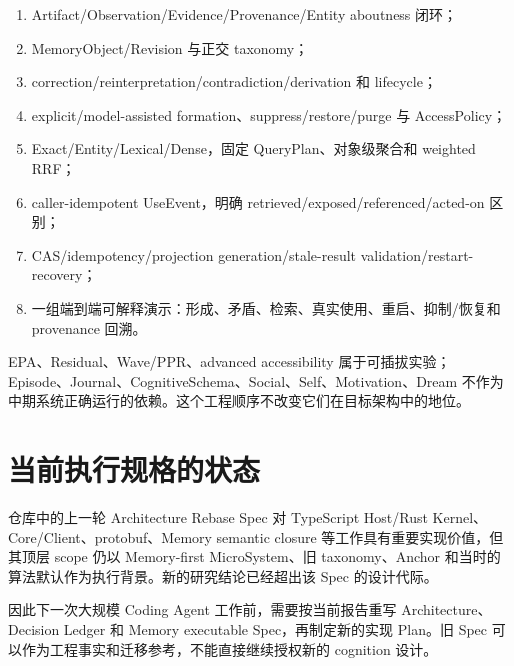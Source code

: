 \begin{enumerate}
\item Artifact/\allowbreak Observation/\allowbreak Evidence/\allowbreak Provenance/\allowbreak Entity aboutness 闭环；
\item MemoryObject/Revision 与正交 taxonomy；
\item correction/\allowbreak reinterpretation/\allowbreak contradiction/\allowbreak derivation 和 lifecycle；
\item explicit/model-assisted formation、suppress/restore/purge 与 AccessPolicy；
\item Exact/Entity/Lexical/Dense，固定 QueryPlan、对象级聚合和 weighted RRF；
\item caller-idempotent UseEvent，明确 retrieved/exposed/referenced/acted-on 区别；
\item CAS/idempotency/projection generation/stale-result validation/restart-recovery；
\item 一组端到端可解释演示：形成、矛盾、检索、真实使用、重启、抑制/恢复和 provenance 回溯。
\end{enumerate}

EPA、Residual、Wave/PPR、advanced accessibility 属于可插拔实验；Episode、Journal、CognitiveSchema、Social、Self、Motivation、Dream 不作为中期系统正确运行的依赖。这个工程顺序不改变它们在目标架构中的地位。

\section{当前执行规格的状态}

仓库中的上一轮 Architecture Rebase Spec 对 TypeScript Host/Rust Kernel、Core/Client、protobuf、Memory semantic closure 等工作具有重要实现价值，但其顶层 scope 仍以 Memory-first MicroSystem、旧 taxonomy、Anchor 和当时的算法默认作为执行背景。新的研究结论已经超出该 Spec 的设计代际。

因此下一次大规模 Coding Agent 工作前，需要按当前报告重写 Architecture、Decision Ledger 和 Memory executable Spec，再制定新的实现 Plan。旧 Spec 可以作为工程事实和迁移参考，不能直接继续授权新的 cognition 设计。
